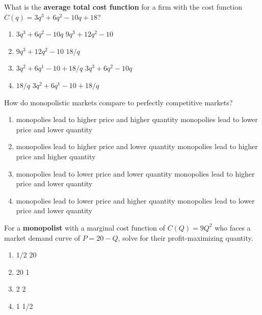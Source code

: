 \begin{question}[type=exam]{3}
  What is the \textbf{average total cost function} for a firm with the cost function
  $C(q)=3q^3+6q^2-10q+18$?
  \begin{enumerate}[label=\alph*), noitemsep]
    \item \vary
      {$3q^3+6q^2-10q$}
      {$9q^3+12q^2-10$}
    \item \vary
      {$9q^3+12q^2-10$}
      {$18/q$}
    \item \vary
      {$3q^2+6q^1-10+18/q$} %
      {$3q^3+6q^2-10q$}
    \item \vary
      {$18/q$}
      {$3q^2+6q^1-10+18/q$} %
  \end{enumerate}
\end{question}

\begin{question}[type=exam]{3}
  How do monopolistic markets compare to perfectly competitive markets?
  \begin{enumerate}[label=\alph*), noitemsep]
    \item \vary
      {monopolies lead to higher price and higher quantity}
      {monopolies lead to lower price and lower quantity}
    \item \vary
      {monopolies lead to higher price and lower quantity} %
      {monopolies lead to higher price and higher quantity}
    \item \vary
      {monopolies lead to lower price and lower quantity}
      {monopolies lead to higher price and lower quantity} %
    \item \vary
      {monopolies lead to lower price and higher quantity}
      {monopolies lead to lower price and lower quantity}
  \end{enumerate}
\end{question}


\newpage

\begin{question}[type=exam]{3}
  For a \textbf{monopolist} with a marginal cost function of $C(Q)=9Q^2$
  who faces a market demand curve of $P=20-Q$,
  solve for their profit-maximizing quantity.
  \begin{enumerate}[label=\alph*), noitemsep]
    \item \vary
      {1/2}
      {20}
    \item \vary
      {20}
      {1} %
    \item \vary
      {2} 
      {2} 
    \item \vary
      {1} %
      {1/2}
  \end{enumerate}
\end{question}

